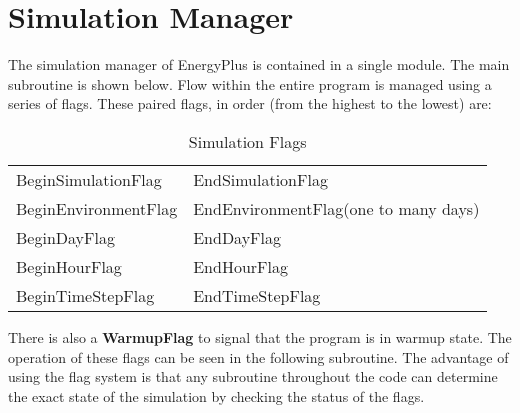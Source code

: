 \section{Simulation Manager}\label{simulation-manager}

The simulation manager of EnergyPlus is contained in a single module. The main subroutine is shown below. Flow within the entire program is managed using a series of flags. These paired flags, in order (from the highest to the lowest) are:

\begin{longtable}[c]{@{}ll@{}}
\caption{Simulation Flags \label{table:simulation-flags}} \tabularnewline
\toprule 
\endhead

BeginSimulationFlag & EndSimulationFlag \tabularnewline
BeginEnvironmentFlag & EndEnvironmentFlag(one to many days) \tabularnewline
BeginDayFlag & EndDayFlag \tabularnewline
BeginHourFlag & EndHourFlag \tabularnewline
BeginTimeStepFlag & EndTimeStepFlag \tabularnewline
\bottomrule
\end{longtable}

There is also a \textbf{WarmupFlag} to signal that the program is in warmup state. The operation of these flags can be seen in the following subroutine. The advantage of using the flag system is that any subroutine throughout the code can determine the exact state of the simulation by checking the status of the flags.

